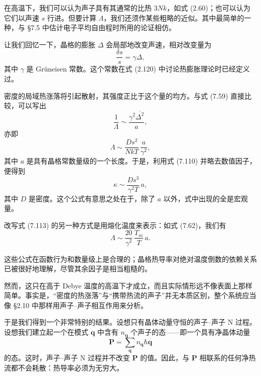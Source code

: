 在高温下，我们可以认为声子具有其通常的比热 $3Nk$，如式 (2.60)；也可以认为它们以声速 $s$ 行进。但要计算 $\Lambda$，我们还须作某些粗略的近似。其中最简单的一种，与 §7.5 中估计电子平均自由程时所用的论证相仿。

让我们回忆一下，晶格的膨胀 $\Delta$ 会局部地改变声速，相对改变量为
\begin{equation*}
\frac{\delta s}{s}=\gamma\Delta,\tag{7.111}
\end{equation*}
其中 $\gamma$ 是 Grüneisen 常数。这个常数在式 (2.120) 中讨论热膨胀理论时已经定义过。

密度的局域热涨落将引起散射，其强度正比于这个量的均方。与式 (7.59) 直接比较，可以写出
\begin{equation*}
\frac{1}{\Lambda}\sim\frac{\gamma^{2}\overline{\Delta^{2}}}{a},\tag{7.112}
\end{equation*}
亦即
\begin{equation*}
\Lambda\sim\frac{Ds^{2}}{NkT}\,\frac{a}{\gamma^{2}},\tag{7.113}
\end{equation*}
其中 $a$ 是具有晶格常数量级的一个长度。于是，利用式 (7.110) 并略去数值因子，便得到
\begin{equation*}
\kappa\sim\frac{Ds^{3}}{\gamma^{2}T}\,a,\tag{7.114}
\end{equation*}
其中 $D$ 是密度。这个公式有意思之处在于，除了 $a$ 以外，式中出现的全是宏观量。

改写式 (7.113) 的另一种方式是用熔化温度来表示：如式 (7.62)，我们有
\begin{equation*}
\Lambda\sim\frac{20}{\gamma^{2}}\,\frac{T_{m}}{T}\,a.\tag{7.115}
\end{equation*}

这些公式在函数行为和数量级上是合理的；晶格热导率对绝对温度倒数的依赖关系已被很好地理解，尽管其余因子是相当粗糙的。

然而，这只在高于 Debye 温度的高温下才成立，而且实际情形远不像表面上那样简单。事实是，“密度的热涨落”与“携带热流的声子”并无本质区别，整个系统应当像 §2.10 中那样用声子--声子相互作用来分析。

于是我们得到一个非常特别的结果。设想只有晶体动量守恒的声子--声子 N 过程。设想我们建立起一个在模式 $\mathbf{q}$ 中含有 $n_{\mathbf{q}}$ 个声子的态——即一个具有净晶体动量
\begin{equation*}
\mathbf{P}=\sum_{\mathbf{q}}n_{\mathbf{q}}\hbar\mathbf{q}\tag{7.116}
\end{equation*}
的态。这时，声子--声子 N 过程并不改变 $\mathbf{P}$ 的值。因此，与 $\mathbf{P}$ 相联系的任何净热流都不会耗散：热导率必须为无穷大。

